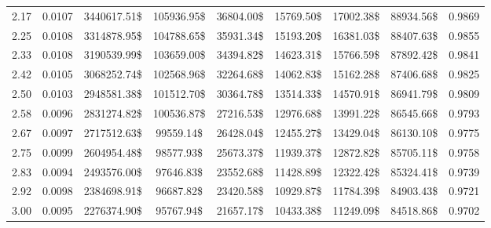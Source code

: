 \begin{tabular}{ccccccccc}
\num{2.17} & \num{0.0107} & \num{3440617.51}\$ & \num{105936.95}\$ & \num{36804.00}\$ & \num{15769.50}\$ & \num{17002.38}\$ &  \num{88934.56}\$ & \num{0.9869} \\
\num{2.25} & \num{0.0108} & \num{3314878.95}\$ & \num{104788.65}\$ & \num{35931.34}\$ & \num{15193.20}\$ & \num{16381.03}\$ &  \num{88407.63}\$ & \num{0.9855} \\
\num{2.33} & \num{0.0108} & \num{3190539.99}\$ & \num{103659.00}\$ & \num{34394.82}\$ & \num{14623.31}\$ & \num{15766.59}\$ &  \num{87892.42}\$ & \num{0.9841} \\
\num{2.42} & \num{0.0105} & \num{3068252.74}\$ & \num{102568.96}\$ & \num{32264.68}\$ & \num{14062.83}\$ & \num{15162.28}\$ &  \num{87406.68}\$ & \num{0.9825} \\
\num{2.50} & \num{0.0103} & \num{2948581.38}\$ & \num{101512.70}\$ & \num{30364.78}\$ & \num{13514.33}\$ & \num{14570.91}\$ &  \num{86941.79}\$ & \num{0.9809} \\
\num{2.58} & \num{0.0096} & \num{2831274.82}\$ & \num{100536.87}\$ & \num{27216.53}\$ & \num{12976.68}\$ & \num{13991.22}\$ &  \num{86545.66}\$ & \num{0.9793} \\
\num{2.67} & \num{0.0097} & \num{2717512.63}\$ &  \num{99559.14}\$ & \num{26428.04}\$ & \num{12455.27}\$ & \num{13429.04}\$ &  \num{86130.10}\$ & \num{0.9775} \\
\num{2.75} & \num{0.0099} & \num{2604954.48}\$ &  \num{98577.93}\$ & \num{25673.37}\$ & \num{11939.37}\$ & \num{12872.82}\$ &  \num{85705.11}\$ & \num{0.9758} \\
\num{2.83} & \num{0.0094} & \num{2493576.00}\$ &  \num{97646.83}\$ & \num{23552.68}\$ & \num{11428.89}\$ & \num{12322.42}\$ &  \num{85324.41}\$ & \num{0.9739} \\
\num{2.92} & \num{0.0098} & \num{2384698.91}\$ &  \num{96687.82}\$ & \num{23420.58}\$ & \num{10929.87}\$ & \num{11784.39}\$ &  \num{84903.43}\$ & \num{0.9721} \\
\num{3.00} & \num{0.0095} & \num{2276374.90}\$ &  \num{95767.94}\$ & \num{21657.17}\$ & \num{10433.38}\$ & \num{11249.09}\$ &  \num{84518.86}\$ & \num{0.9702} \\
\bottomrule
\end{tabular}
